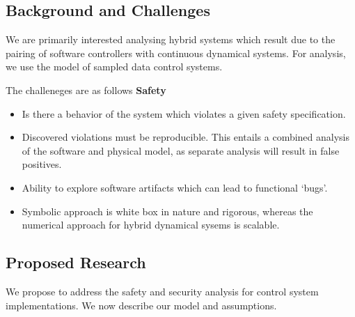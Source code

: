 




\subsection{Background and Challenges}

We are primarily interested analysing hybrid systems which result due
to the pairing of software controllers with continuous dynamical
systems. For analysis, we use the model of sampled data control
systems.

The challeneges are as follows
\textbf{Safety}
\begin{itemize}
    \item Is there a behavior of the system which violates a given
        safety specification.
    \item Discovered violations must be reproducible. This entails a
        combined analysis of the software and physical model, as
        separate analysis will result in false positives.
    \item Ability to explore software artifacts which can lead to
        functional `bugs'.
    \item Symbolic approach is white box in nature and rigorous,
        whereas the numerical approach for hybrid dynamical sysems is
        scalable.
\end{itemize}

\subsection{Proposed Research}
We propose to address the safety and security analysis for control
system implementations. We now describe our model and assumptions.

